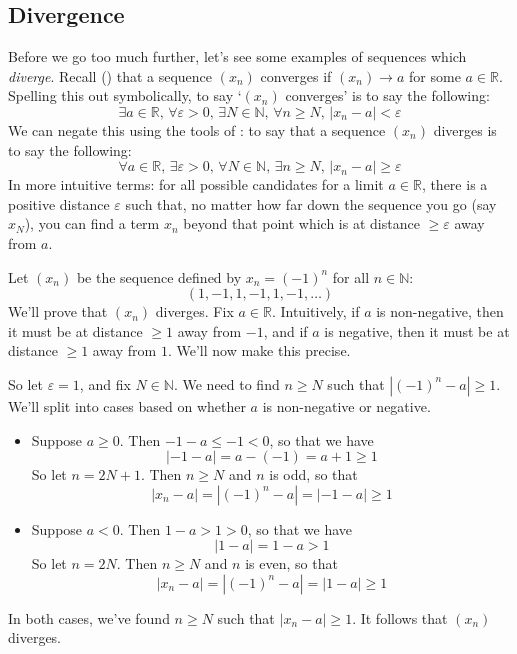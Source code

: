 \subsection*{Divergence}

Before we go too much further, let's see some examples of sequences which \textit{diverge}. Recall () that a sequence $(x_n)$ converges if $(x_n) \to a$ for some $a \in \mathbb{R}$. Spelling this out symbolically, to say `$(x_n)$ converges' is to say the following:
\[ \exists a \in \mathbb{R},\, \forall \varepsilon > 0,\, \exists N \in \mathbb{N},\, \forall n \ge N,\, |x_n-a|<\varepsilon \]
We can negate this using the tools of : to say that a sequence $(x_n)$ diverges is to say the following:
\[ \forall a \in \mathbb{R},\, \exists \varepsilon > 0,\, \forall N \in \mathbb{N},\, \exists n \ge N,\, |x_n-a| \ge \varepsilon \]
In more intuitive terms: for all possible candidates for a limit $a \in \mathbb{R}$, there is a positive distance $\varepsilon$ such that, no matter how far down the sequence you go (say $x_N$), you can find a term $x_n$ beyond that point which is at distance $\ge \varepsilon$ away from $a$.

\begin{example}
\label{exSequencePlusMinusOneDiverges}
Let $(x_n)$ be the sequence defined by $x_n=(-1)^n$ for all $n \in \mathbb{N}$:
\[ (1,-1,1,-1,1,-1,\dots) \]
We'll prove that $(x_n)$ diverges. Fix $a \in \mathbb{R}$. Intuitively, if $a$ is non-negative, then it must be at distance $\ge 1$ away from $-1$, and if $a$ is negative, then it must be at distance $\ge 1$ away from $1$. We'll now make this precise.

So let $\varepsilon = 1$, and fix $N \in \mathbb{N}$. We need to find $n \ge N$ such that $|({-1})^n-a| \ge 1$. We'll split into cases based on whether $a$ is non-negative or negative.
\begin{itemize}
\item Suppose $a \ge 0$. Then ${-1}-a \le -1 < 0$, so that we have
\[ |{-1}-a| = a-(-1) = a+1 \ge 1 \]
So let $n=2N+1$. Then $n \ge N$ and $n$ is odd, so that
\[ |x_n-a|=|({-1})^n-a|=|{-1}-a| \ge 1 \]
\item Suppose $a<0$. Then $1-a > 1 > 0$, so that we have
\[ |1-a| = 1-a > 1 \]
So let $n=2N$. Then $n \ge N$ and $n$ is even, so that
\[ |x_n-a| = |({-1})^n-a|=|1-a| \ge 1 \]
\end{itemize}
In both cases, we've found $n \ge N$ such that $|x_n-a| \ge 1$. It follows that $(x_n)$ diverges.
\end{example}

